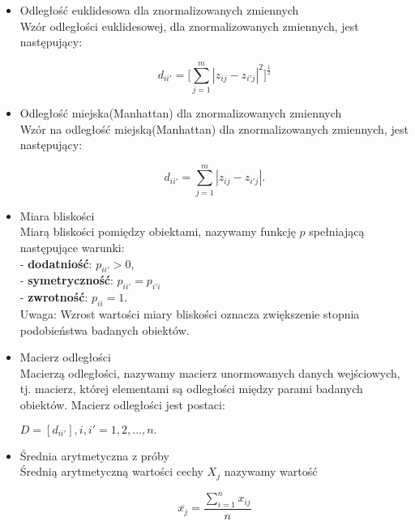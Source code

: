 \documentclass[12pt,a4paper]{report}
\begin{document}
\begin{itemize}
\item Odległość euklidesowa dla znormalizowanych zmiennych \cite[Rozdział 1.6]{panek2013}\\
Wzór odległości euklidesowej, dla znormalizowanych zmiennych, jest następujący:
\begin{center}
$$d_{ii'}=\big[\sum_{j=1}^{m}|z_{ij}-z_{i'j}|^{2} \big]^{\frac{1}{2}}$$
\end{center}

\item Odległość miejska(Manhattan) dla znormalizowanych zmiennych \cite[Rozdział 1.6]{panek2013}\\
Wzór na odległość miejską(Manhattan) dla znormalizowanych zmiennych, jest następujący:
\begin{center}
$$d_{ii'}=\sum_{j=1}^{m}|z_{ij}-z_{i'j}|.$$
\end{center}

\item Miara bliskości \cite[Rozdział 1.6]{panek2013}\\
Miarą bliskości pomiędzy obiektami, nazywamy funkcję $p$ spełniającą następujące warunki:\\
- {\bf dodatniość}: $p_{ii'} > 0$,\\
- {\bf symetryczność}: $p_{ii'} = p_{i'i}$\\
- {\bf zwrotność}: $p_{ii} = 1$.\\
Uwaga: Wzrost wartości miary bliskości oznacza zwiększenie stopnia podobieństwa badanych obiektów.\\

\item Macierz odległości \cite[Rozdział 1.6]{panek2013}\\
Macierzą odległości, nazywamy macierz unormowanych danych wejściowych, tj. macierz, której elementami są odległości między parami badanych obiektów. Macierz odległości jest postaci:
\begin{center}
$D = [d_{ii'}], i,i'=1, 2, ..., n.$\\
\end{center}

\item Średnia arytmetyczna z próby \cite[Rozdział 2.2]{mlodak2006}\\
Średnią arytmetyczną wartości cechy $X_{j}$ nazywamy wartość 
\begin{center}
$$\overline{x_{j}}= \frac{\sum_{i=1}^{n} x_{ij}}{n}$$\\
\end{center}


\end{itemize}
\end{document}
